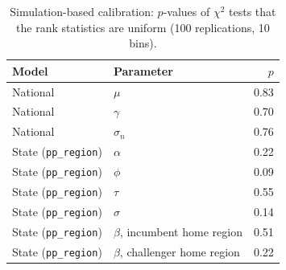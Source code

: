 \documentclass[preprint,12pt,authoryear]{elsarticle}
\begin{document}
\begin{table}[ht]
\centering
\caption{Simulation-based calibration: $p$-values of $\chi^2$ tests that the rank statistics are uniform (100 replications, 10 bins).}
\label{tab:sbc}
\small
\begin{tabular}{llr}
\toprule
Model & Parameter & $p$ \\
\midrule
National & $\mu$ & 0.83 \\
National & $\gamma$ & 0.70 \\
National & $\sigma_n$ & 0.76 \\
State (\texttt{pp\_region}) & $\alpha$ & 0.22 \\
State (\texttt{pp\_region}) & $\phi$ & 0.09 \\
State (\texttt{pp\_region}) & $\tau$ & 0.55 \\
State (\texttt{pp\_region}) & $\sigma$ & 0.14 \\
State (\texttt{pp\_region}) & $\beta$, incumbent home region & 0.51 \\
State (\texttt{pp\_region}) & $\beta$, challenger home region & 0.22 \\
\bottomrule
\end{tabular}
\end{table}



\end{document}

